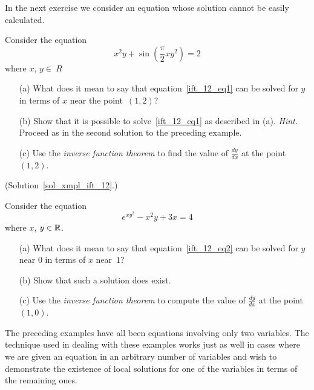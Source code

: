 In the next exercise we consider an equation whose solution cannot be easily calculated.

\begin{exer}\label{xmpl_ift_12} Consider the equation
  \begin{equation}\label{ift_12_eq1}
        x^2y + \sin\left(\frac{\pi}2 xy^2\right) = 2
  \end{equation}
where $x$, $y \in \ R$
 \begin{enumerate}
  \item[(a)] What does it mean to say that equation~\eqref{ift_12_eq1} can be solved for $y$ in
terms of $x$ near the point~$(1,2)$?
  \item[(b)]  Show that it is possible to solve~\eqref{ift_12_eq1} as described in (a).
\emph{Hint.}  Proceed as in the second solution to the preceding example.
  \item[(c)] Use the \emph{inverse function theorem} to find the value of $\frac{dy}{dx}$
at the point~$(1,2)$.
 \end{enumerate}
(Solution~\ref{sol_xmpl_ift_12}.)
\end{exer}

\begin{prob}  Consider the equation
  \begin{equation}\label{ift_12_eq2}
       e^{xy^2} - x^2y + 3x = 4
  \end{equation}
where $x$, $y \in \mathbb{R}$.
 \begin{enumerate}
  \item[(a)] What does it mean to say that equation~\eqref{ift_12_eq2} can be solved for $y$
near 0 in terms of $x$ near~$1$?
  \item[(b)] Show that such a solution does exist.
  \item[(c)] Use the \emph{inverse function theorem} to compute the value of $\frac{dy}{dx}$ at
the point~$(1,0)$.
 \end{enumerate}
\end{prob}

The preceding examples have all been equations involving only two variables.  The technique
used in dealing with these examples works just as well in cases where we are given an equation
in an arbitrary number of variables and wish to demonstrate the existence of local solutions
for one of the variables in terms of the remaining ones.

